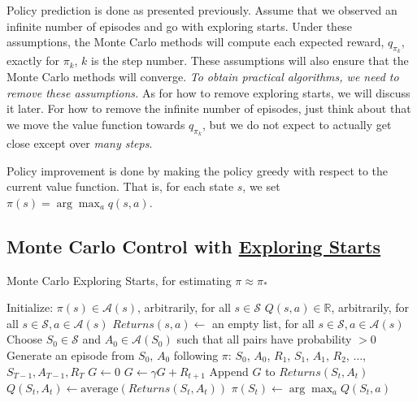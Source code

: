 Policy prediction is done as presented previously. Assume that we observed an infinite number of episodes and go with exploring starts. Under these assumptions, the Monte Carlo methods will compute each expected reward, $q_{\pi_k}$, exactly for $\pi_k$, $k$ is the step number. These assumptions will also ensure that the Monte Carlo methods will converge. \emph{To obtain practical algorithms, we need to remove these assumptions.} As for how to remove exploring starts, we will discuss it later. For how to remove the infinite number of episodes, just think about that we move the value function towards $q_{\pi_k}$, but we do not expect to actually get close except over \emph{many steps}.

Policy improvement is done by making the policy greedy with respect to the current value function. That is, for each state $s$, we set $\pi(s) = \arg\max_a q(s,a)$.

\subsection{Monte Carlo Control with \texorpdfstring{\hyperref[sec:exploring-start]{Exploring Starts}}{Exploring Starts}}

\begin{algorithm}
    \caption{Monte Carlo Exploring Starts, for estimating $\pi \approx \pi_*$}\label{alg:MC_ES}
    \begin{algorithmic}
        \State Initialize:
        \State \hspace{\algorithmicindent} $\pi(s) \in \mathcal{A}(s)$, arbitrarily, for all $s \in \mathcal{S}$
        \State \hspace{\algorithmicindent} $Q(s,a) \in \mathbb{R}$, arbitrarily, for all $s \in \mathcal{S}, a \in \mathcal{A}(s)$
        \State \hspace{\algorithmicindent} $Returns(s,a) \leftarrow$ an empty list, for all $s \in \mathcal{S}, a \in \mathcal{A}(s)$
        \State Choose $S_0 \in \mathcal{S}$ and $A_0 \in \mathcal{A}(S_0)$ such that all pairs have probability $> 0$
        \State Generate an episode from $S_0$, $A_0$ following $\pi$: $S_0$, $A_0$, $R_1$, $S_1$, $A_1$, $R_2$, $\dots$, $S_{T-1}, A_{T-1}, R_T$
        \State $G \leftarrow 0$
        \State $G \leftarrow \gamma G + R_{t+1}$
        \State Append $G$ to $Returns(S_t, A_t)$
        \State $Q(S_t, A_t) \leftarrow \text{average}(Returns(S_t, A_t))$
        \State $\pi(S_t) \leftarrow \arg\max_a Q(S_t, a)$
        \EndIf
        \EndFor
        \EndLoop
    \end{algorithmic}
\end{algorithm}

